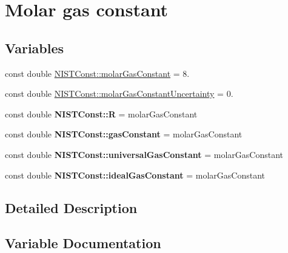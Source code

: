 \hypertarget{group___molar_gas_constant}{}\section{Molar gas constant}
\label{group___molar_gas_constant}
\subsection*{Variables}
\begin{DoxyCompactItemize}
\item 
const double \hyperlink{group___molar_gas_constant_ga923e5cda42e8fec4a70640b82051d309}{N\+I\+S\+T\+Const\+::molar\+Gas\+Constant} = 8.
\item 
const double \hyperlink{group___molar_gas_constant_ga0b24ac606a3ba6a685599a78586fbc77}{N\+I\+S\+T\+Const\+::molar\+Gas\+Constant\+Uncertainty} = 0.
\item 
\mbox{\label{group___molar_gas_constant_gaa556f6ded49d1e2f9d5059fdd382bfd4}} 
const double {\bfseries N\+I\+S\+T\+Const\+::R} = molar\+Gas\+Constant
\item 
\mbox{\label{group___molar_gas_constant_ga8a80485a1bf8e9acded5ddd69a05084f}} 
const double {\bfseries N\+I\+S\+T\+Const\+::gas\+Constant} = molar\+Gas\+Constant
\item 
\mbox{\label{group___molar_gas_constant_ga081ff52b90c1476a7c7e55dcee67fa8e}} 
const double {\bfseries N\+I\+S\+T\+Const\+::universal\+Gas\+Constant} = molar\+Gas\+Constant
\item 
\mbox{\label{group___molar_gas_constant_ga0315ba6edc63c93914224443ef8a6e17}} 
const double {\bfseries N\+I\+S\+T\+Const\+::ideal\+Gas\+Constant} = molar\+Gas\+Constant
\end{DoxyCompactItemize}


\subsection{Detailed Description}


\subsection{Variable Documentation}
\mbox{\label{group___molar_gas_constant_ga923e5cda42e8fec4a70640b82051d309}} 
